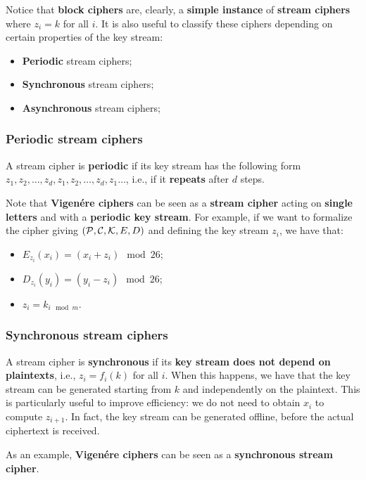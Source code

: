 Notice that \textbf{block ciphers} are, clearly, a \textbf{simple instance} of \textbf{stream ciphers} where $z_i = k$ for all $i$. It is also useful to classify these ciphers depending on certain properties of the key stream:

\begin{itemize}
    \item \textbf{Periodic} stream ciphers;
    \item \textbf{Synchronous} stream ciphers;
    \item \textbf{Asynchronous} stream ciphers;
\end{itemize}

\subsubsection{Periodic stream ciphers}
A stream cipher is \textbf{periodic} if its key stream has the following form $z_1,z_2,\ldots,z_d,z_{1},z_2,\ldots,z_d,z_1\ldots$, i.e., if it \textbf{repeats} after $d$ steps.

Note that \textbf{Vigenére ciphers} can be seen as a \textbf{stream cipher} acting on \textbf{single letters} and with a \textbf{periodic key stream}. For example, if we want to formalize the cipher giving $({\cal P},{\cal C},{\cal K},E,D)$  and defining the key stream $z_i$, we have that:

\begin{itemize}
    \item $E_{z_i}(x_i)=(x_i+z_i) \mod 26$;
    \item $D_{z_i}(y_i)=(y_i-z_i) \mod 26$;
    \item $z_i = k_{i \mod m}$.
\end{itemize}

\subsubsection{Synchronous stream ciphers}
A stream cipher is \textbf{synchronous} if its \textbf{key stream does not depend on plaintexts}, i.e., $z_i = f_i(k)$ for all $i$. When this happens, we have that the key stream can be generated starting from $k$ and independently on the plaintext. This is particularly useful to improve efficiency: we do not need to obtain $x_{i}$ to compute $z_{i+1}$. In fact, the key stream can be generated offline, before the actual ciphertext is received.

As an example, \textbf{Vigenére ciphers} can be seen as a \textbf{synchronous stream cipher}.

